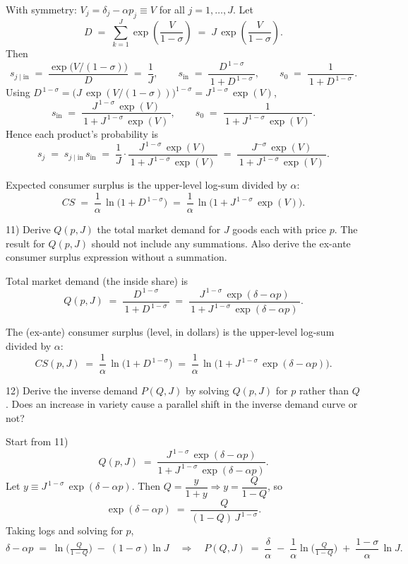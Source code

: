 \documentclass{article}
\begin{document}
With symmetry: $V_j=\delta_j-\alpha p_j\equiv V$ for all $j=1,\ldots,J$.
Let
\[
D \;=\; \sum_{k=1}^J \exp\!\left(\frac{V}{1-\sigma}\right)
\;=\; J\,\exp\!\left(\frac{V}{1-\sigma}\right).
\]
Then
\[
s_{j\mid \text{in}} \;=\; \frac{\exp\!\big(V/(1-\sigma)\big)}{D} \;=\; \frac{1}{J},
\qquad
s_{\text{in}} \;=\; \frac{D^{\,1-\sigma}}{\,1+D^{\,1-\sigma}\,},
\qquad
s_0 \;=\; \frac{1}{\,1+D^{\,1-\sigma}\,}.
\]
Using $D^{\,1-\sigma} = \big(J\,\exp(V/(1-\sigma))\big)^{1-\sigma} = J^{\,1-\sigma}\,\exp(V)$,
\[
s_{\text{in}} \;=\; \frac{J^{\,1-\sigma}\,\exp(V)}{\,1+J^{\,1-\sigma}\,\exp(V)\,},
\qquad
s_0 \;=\; \frac{1}{\,1+J^{\,1-\sigma}\,\exp(V)\,}.
\]
Hence each product’s probability is
\[
s_j \;=\; s_{j\mid \text{in}}\,s_{\text{in}}
\;=\; \frac{1}{J}\cdot \frac{J^{\,1-\sigma}\,\exp(V)}{\,1+J^{\,1-\sigma}\,\exp(V)\,}
\;=\; \frac{J^{-\sigma}\,\exp(V)}{\,1+J^{\,1-\sigma}\,\exp(V)\,}.
\]

Expected consumer surplus is the upper-level log-sum divided by $\alpha$:
\[
CS \;=\; \frac{1}{\alpha}\,\ln\!\big(1 + D^{\,1-\sigma}\big)
\;=\; \frac{1}{\alpha}\,\ln\!\big(1 + J^{\,1-\sigma}\,\exp(V)\big).
\]



\begin{tcolorbox}
11) Derive $Q(p,J)$ the total market demand for $J$ goods each with price $p$. The result for $Q(p,J)$ should not include any summations. Also derive the ex-ante consumer surplus expression without a summation.
\end{tcolorbox}

Total market demand (the inside share) is
\[
Q(p,J) \;=\; \frac{D^{\,1-\sigma}}{\,1+D^{\,1-\sigma}\,}
\;=\;
\frac{J^{\,1-\sigma}\,\exp(\delta-\alpha p)}{\,1+J^{\,1-\sigma}\,\exp(\delta-\alpha p)\,}.
\]

The (ex-ante) consumer surplus (level, in dollars) is the upper-level log-sum divided by $\alpha$:
\[
CS(p,J) \;=\; \frac{1}{\alpha}\,\ln\!\big(1 + D^{\,1-\sigma}\big)
\;=\; \frac{1}{\alpha}\,\ln\!\big(1 + J^{\,1-\sigma}\,\exp(\delta-\alpha p)\big).
\]


\begin{tcolorbox}
12) Derive the inverse demand $P(Q,J)$ by solving $Q(p,J)$ for $p$ rather than $Q$. Does an increase in variety cause a parallel shift in the inverse demand curve or not?
\end{tcolorbox}

Start from 11)
\[
Q(p,J)\;=\;\frac{J^{\,1-\sigma}\,\exp(\delta-\alpha p)}{1+J^{\,1-\sigma}\,\exp(\delta-\alpha p)}.
\]
Let \(y \equiv J^{\,1-\sigma}\,\exp(\delta-\alpha p)\). Then \(Q=\dfrac{y}{1+y}\Rightarrow y=\dfrac{Q}{1-Q}\), so
\[
\exp(\delta-\alpha p)\;=\;\frac{Q}{(1-Q)\,J^{\,1-\sigma}}.
\]
Taking logs and solving for \(p\),
\[
\delta-\alpha p \;=\; \ln\!\Big(\tfrac{Q}{1-Q}\Big)\;-\;(1-\sigma)\ln J
\quad\Rightarrow\quad
P(Q,J)\;=\;\frac{\delta}{\alpha}\;-\;\frac{1}{\alpha}\ln\!\Big(\tfrac{Q}{1-Q}\Big)\;+\;\frac{1-\sigma}{\alpha}\,\ln J.
\]
\end{document}
